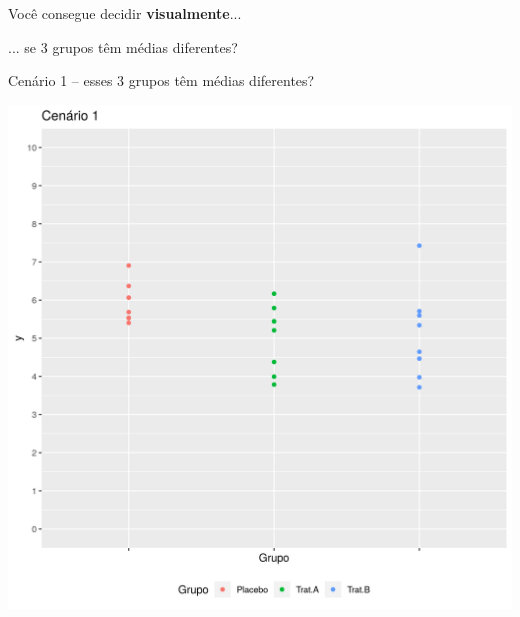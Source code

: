 \documentclass{beamer}
\begin{document}
\begin{frame}[label=ident-visual]
  \begin{center}
    \large
    Você consegue decidir {\bf visualmente}...

    \bigskip
    ... se 3 grupos têm médias diferentes?
  \end{center}
\end{frame}

\begin{frame}[label=cenario1]{\small Cenário 1 -- esses 3 grupos têm médias diferentes?}
  \begin{center}
    \includegraphics[height=.9\textheight]{Cap13-30/cenario1}
  \end{center}
\end{frame}
\end{document}

